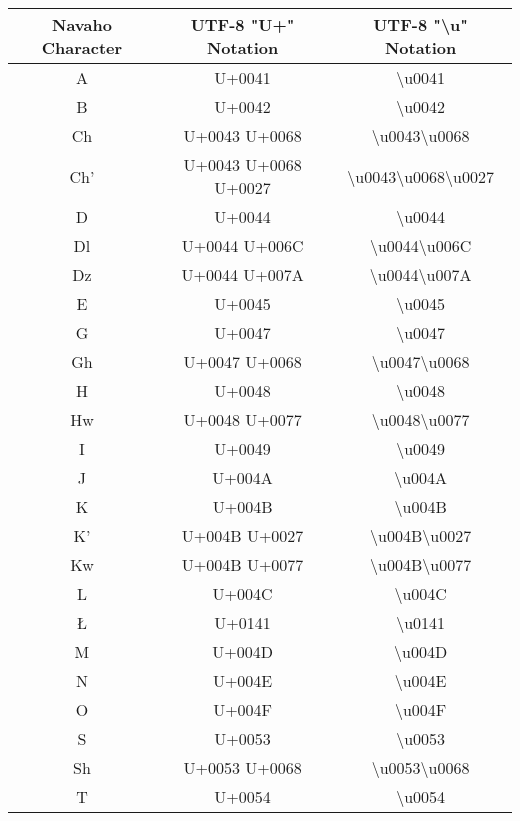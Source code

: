 \begin{longtable}{|c|c|c|}
\hline
Navaho Character & UTF-8 "U+" Notation & UTF-8 "\textbackslash{u}" Notation \\
\hline
A & U+0041 & \textbackslash{}u0041 \\ \hline
B & U+0042 & \textbackslash{}u0042 \\ \hline
Ch & U+0043 U+0068 & \textbackslash{}u0043\textbackslash{}u0068 \\ \hline
Ch' & U+0043 U+0068 U+0027 & \textbackslash{}u0043\textbackslash{}u0068\textbackslash{}u0027 \\ \hline
D & U+0044 & \textbackslash{}u0044 \\ \hline
Dl & U+0044 U+006C & \textbackslash{}u0044\textbackslash{}u006C \\ \hline
Dz & U+0044 U+007A & \textbackslash{}u0044\textbackslash{}u007A \\ \hline
E & U+0045 & \textbackslash{}u0045 \\ \hline
G & U+0047 & \textbackslash{}u0047 \\ \hline
Gh & U+0047 U+0068 & \textbackslash{}u0047\textbackslash{}u0068 \\ \hline
H & U+0048 & \textbackslash{}u0048 \\ \hline
Hw & U+0048 U+0077 & \textbackslash{}u0048\textbackslash{}u0077 \\ \hline
I & U+0049 & \textbackslash{}u0049 \\ \hline
J & U+004A & \textbackslash{}u004A \\ \hline
K & U+004B & \textbackslash{}u004B \\ \hline
K' & U+004B U+0027 & \textbackslash{}u004B\textbackslash{}u0027 \\ \hline
Kw & U+004B U+0077 & \textbackslash{}u004B\textbackslash{}u0077 \\ \hline
L & U+004C & \textbackslash{}u004C \\ \hline
Ł & U+0141 & \textbackslash{}u0141 \\ \hline
M & U+004D & \textbackslash{}u004D \\ \hline
N & U+004E & \textbackslash{}u004E \\ \hline
O & U+004F & \textbackslash{}u004F \\ \hline
S & U+0053 & \textbackslash{}u0053 \\ \hline
Sh & U+0053 U+0068 & \textbackslash{}u0053\textbackslash{}u0068 \\ \hline
T & U+0054 & \textbackslash{}u0054 \\ \hline

\end{longtable}
